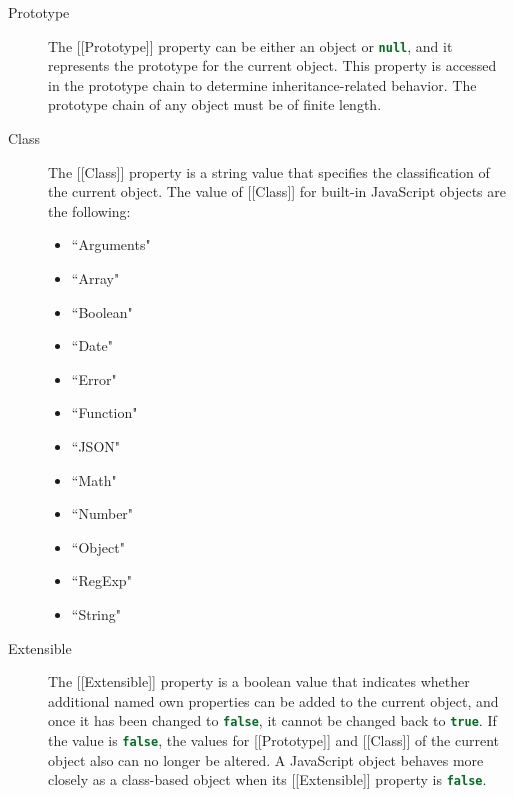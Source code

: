 \documentclass[a4paper,11pt,twoside]{report}
\def\jsinline{\lstinline[language=JavaScript, basicstyle=\small]}%\end{lstlisting}
\begin{document}
\begin{description}
\item[Prototype] The [[Prototype]] property can be either an object or \jsinline|null|, and it represents the prototype for the current object. This property is accessed in the prototype chain to determine inheritance-related behavior. The prototype chain of any object must be of finite length. 

\item[Class] The [[Class]] property is a string value that specifies the classification of the current object. The value of [[Class]] for built-in JavaScript objects are the following:
\begin{multicols}{3}
\begin{itemize}
	\item ``Arguments"
	\item ``Array"
	\item ``Boolean"
	\item ``Date"
	\item ``Error"
	\item ``Function"
	\item ``JSON"
	\item ``Math"
	\item ``Number"
	\item ``Object"
	\item ``RegExp"
	\item ``String"
\end{itemize}
\end{multicols}

\item[Extensible] The [[Extensible]] property is a boolean value that indicates whether additional named own properties can be added to the current object, and once it has been changed to \jsinline|false|, it cannot be changed back to \jsinline|true|. If the value is \jsinline|false|, the values for [[Prototype]] and [[Class]] of the current object also can no longer be altered. A JavaScript object behaves more closely as a class-based object when its [[Extensible]] property is \jsinline|false|.
\end{description}
\end{document}
